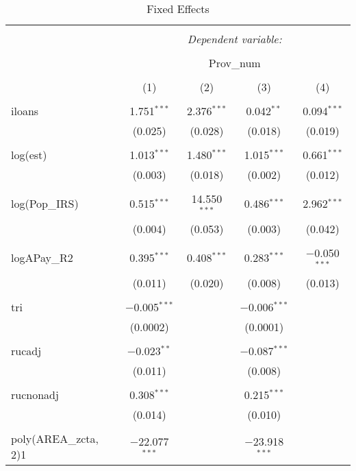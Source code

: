 
\begin{table}[!htbp] \centering 
  \caption{Fixed Effects} 
  \label{tab3:panelfe} 
\begin{tabular}{@{\extracolsep{5pt}}lcccc} 
\\[-1.8ex]\hline 
\hline \\[-1.8ex] 
 & \multicolumn{4}{c}{\textit{Dependent variable:}} \\ 
\cline{2-5} 
\\[-1.8ex] & \multicolumn{4}{c}{Prov\_num} \\ 
\\[-1.8ex] & (1) & (2) & (3) & (4)\\ 
\hline \\[-1.8ex] 
 iloans & 1.751$^{***}$ & 2.376$^{***}$ & 0.042$^{**}$ & 0.094$^{***}$ \\ 
  & (0.025) & (0.028) & (0.018) & (0.019) \\ 
  & & & & \\ 
 log(est) & 1.013$^{***}$ & 1.480$^{***}$ & 1.015$^{***}$ & 0.661$^{***}$ \\ 
  & (0.003) & (0.018) & (0.002) & (0.012) \\ 
  & & & & \\ 
 log(Pop\_IRS) & 0.515$^{***}$ & 14.550$^{***}$ & 0.486$^{***}$ & 2.962$^{***}$ \\ 
  & (0.004) & (0.053) & (0.003) & (0.042) \\ 
  & & & & \\ 
 logAPay\_R2 & 0.395$^{***}$ & 0.408$^{***}$ & 0.283$^{***}$ & $-$0.050$^{***}$ \\ 
  & (0.011) & (0.020) & (0.008) & (0.013) \\ 
  & & & & \\ 
 tri & $-$0.005$^{***}$ &  & $-$0.006$^{***}$ &  \\ 
  & (0.0002) &  & (0.0001) &  \\ 
  & & & & \\ 
 rucadj & $-$0.023$^{**}$ &  & $-$0.087$^{***}$ &  \\ 
  & (0.011) &  & (0.008) &  \\ 
  & & & & \\ 
 rucnonadj & 0.308$^{***}$ &  & 0.215$^{***}$ &  \\ 
  & (0.014) &  & (0.010) &  \\ 
  & & & & \\ 
 poly(AREA\_zcta, 2)1 & $-$22.077$^{***}$ &  & $-$23.918$^{***}$ &  \\ 

\end{tabular}
\end{table}
